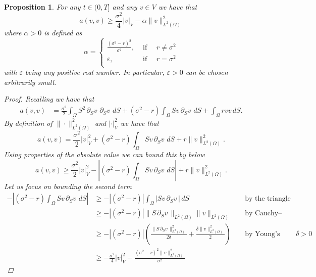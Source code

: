 \documentclass{article}
\newtheorem{prop}[thm]{Proposition}
\newcommand{\intS}[1]{\ensuremath{\int_{\Omega}#1 \, dS}}
\newcommand{\darg}[2]{\ensuremath{\, \partial_{#2}#1} \, }
\newcommand{\dS}[1]{\ensuremath{\darg{#1}{S}}}
\newcommand{\dSv}{\dS{v}}
\newcommand{\sigmafrac}{\ensuremath{\frac{\sigma^2}{2}}}
\newcommand{\seminorm}[1]{\ensuremath{|#1|_V}}
\newcommand{\norm}[1]{\ensuremath{\|#1\|_{L^2(\Omega)}}}
\newcommand{\seminormsq}[1]{\ensuremath{|#1|_V^2}}
\newcommand{\normsq}[1]{\ensuremath{\|#1\|_{L^2(\Omega)}^2}}
\newcommand{\aform}[2]{\ensuremath{\sigmafrac \intS{S^2 \dS{#2} \dS{#1}} + (\sigma^2 - r) \intS{S #2 \dS{#1}} + \intS{r  #1  #2}}}
\begin{document}
\begin{prop}\label{prop:ineq_a}
    For any $t \in (0,T]$ and any $v \in V$ we have that
    \begin{equation*}
        a(v,v) \geq \frac{\sigma^2}{4} \seminorm{v} - \alpha \normsq{v}
    \end{equation*}
    where $\alpha > 0$ is defined as
    \begin{equation*}
        \alpha = \begin{cases}
            \frac{(\sigma^2 - r)^2}{ \sigma^2}, &\text{ if } \quad r \neq \sigma^2\\
            \varepsilon, &\text{ if } \quad r = \sigma^2\\
        \end{cases}
    \end{equation*}
    with $\varepsilon$ being any positive real number. In particular, $\varepsilon >0$ can be chosen arbitrarily small.
    \begin{proof}
        Recalling  we have that
        \begin{align*}
            a(v,v) &= \aform{v}{v}.
        \end{align*}
        By definition of $\normsq{\cdot}$ and $\seminormsq{\cdot}$ we have that
        \begin{equation*}
            a(v,v) = \sigmafrac \seminormsq{v} + (\sigma^2 - r) \intS{S v \dSv} + r \normsq{v}.
        \end{equation*}
        Using properties of the absolute value we can bound this by below
        \begin{equation}\label{eq:first_lower_bound_a}
            a(v,v) \geq \sigmafrac \seminormsq{v} - \left| (\sigma^2 - r) \intS{S v \dSv}\right| + r \normsq{v}.
        \end{equation}
        Let us focus on bounding the second term
        \begin{align*}
            - \left| (\sigma^2 - r) \intS{S v \dSv}\right| &\geq - \left| (\sigma^2 - r) \right| \intS{\left|S v \dSv \right|} && \text{ by the triangle inequality}\\
            &\geq -\left| (\sigma^2 - r) \right| \norm{S \dSv} \norm{v} && \text{ by Cauchy–Schwarz inequality}\\
            &\geq -\left| (\sigma^2 - r) \right| \left( \frac{ \normsq{S \dSv}}{2 \delta} + \frac{\delta \normsq{v}}{2}\right) && \text{ by Young's inequality, $\delta >0$}\\
            & \geq - \frac{\sigma^2}{4} \seminormsq{v} - \frac{(\sigma^2 - r)^2 \normsq{v}}{ \sigma^2}

\end{align*}
\end{proof}
\end{prop}
\end{document}
